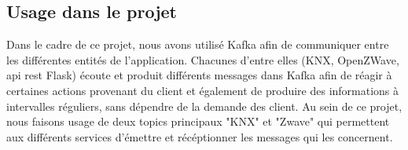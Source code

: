\subsection{Usage dans le projet}
Dans le cadre de ce projet, nous avons utilisé Kafka afin de communiquer entre les différentes entités de l'application.
Chacunes d'entre elles (KNX, OpenZWave, \acrshort{api} rest Flask) écoute et produit différents messages dans Kafka afin de réagir à certaines actions provenant du client et également de produire des informations à intervalles réguliers, sans dépendre de la demande des client. Au sein de ce projet, nous faisons usage de deux topics principaux "KNX" et "Zwave" qui permettent aux différents services d'émettre et récéptionner les messages qui les concernent.

